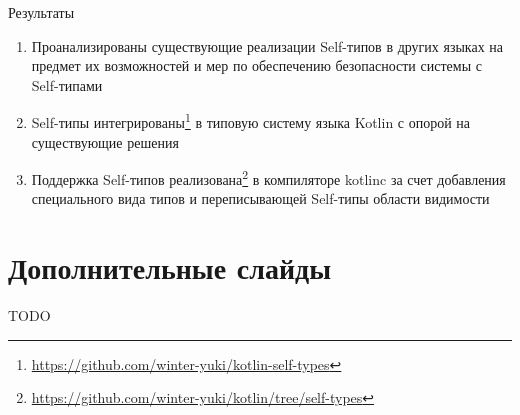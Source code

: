\documentclass[usenames, dvipsnames]{beamer}
\begin{document}
    \begin{frame}{Результаты}

        \begin{enumerate}
            \item Проанализированы существующие реализации Self-типов в других языках на предмет их возможностей и мер по обеспечению безопасности системы с Self-типами
            \item Self-типы интегрированы\footnote{\url{https://github.com/winter-yuki/kotlin-self-types}} в типовую систему языка Kotlin с опорой на существующие решения
            \item Поддержка Self-типов реализована\footnote{\url{https://github.com/winter-yuki/kotlin/tree/self-types}} в компиляторе kotlinc за счет добавления специального вида типов и переписывающей Self-типы области видимости
        \end{enumerate}
    \end{frame}


    \appendix


    \section{Дополнительные слайды}

    \begin{frame}{}
        TODO %
    \end{frame}
\end{document}
